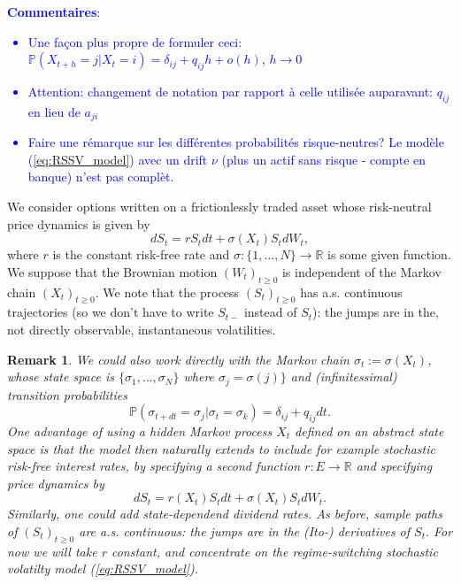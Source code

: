 \documentclass[a4paper, 11pt]{amsart}
\newtheorem{definition and theorem}[theorem]{Definition and   
Theorem}
\newtheorem{remark}[theorem]{%
Remark}
\begin{document}
\textcolor{blue}{{\bf Commentaires}:
    \begin{itemize}
        \item Une fa\c con plus  propre de formuler ceci: $\mathbb{P } (X_{t + h } = j | X_t = i ) = \delta _{ij } + q_{ij }  h + o(h) $, $h \to 0 $
        \item Attention: changement de notation par rapport \`a celle utilis\'ee auparavant: $q_{ij } $ en lieu de $a_{ji } $
        \item Faire une r\'emarque sur les diff\'erentes probabilit\'es risque-neutres? Le mod\`ele (\ref{eq:RSSV_model}) avec un drift $\nu $ (plus un actif sans risque - compte en banque) n'est pas compl\`et.
    \end{itemize}
}
\medskip

We consider options written on a frictionlessly traded asset  whose risk-neutral price dynamics is given by
\begin{equation} \label{eq:RSSV_model}
    dS_t = r S_t dt + \sigma (X_t ) S_t dW_t ,
\end{equation}
where $r $ is the constant risk-free rate and $\sigma : \{ 1 , \ldots , N \} \to \mathbb{R } $ is some given function. We suppose that the Brownian motion $(W_t )_{t \geq 0 } $ is independent of the Markov chain $(X_t )_{t \geq 0 } . $
We note that the process $(S_t )_{t \geq 0 } $ has a.s. continuous trajectories (so we don't have to write $S_{t- } $ instead of $S_t $): the jumps are in the, not directly observable, instantaneous volatilities.

\begin{remark} \rm{We could also work directly with the Markov chain $\sigma _t  := \sigma (X_t ) $, whose state space is $\{ \sigma _1 , \ldots , \sigma _N \} $ where $\sigma _j = \sigma (j) \} $ and (infinitessimal) transition probabilities
        $$
            \mathbb{P } (\sigma _{t + dt } = \sigma _j | \sigma _t = \sigma _k ) = \delta _{ij } + q_{ij } dt .
        $$
        One advantage of using a hidden Markov process $X_t $ defined on an abstract state space is that the model then naturally extends to include for example stochastic risk-free interest rates, by specifying a second function $r : E \to \mathbb{R } $ and specifying price dynamics by
        $$
            dS_t = r(X_t ) S_t dt + \sigma (X_t) S_t dW_t .
        $$
        Similarly, one could add state-dependend dividend rates. As before, sample paths of $(S_t )_{t \geq 0 } $ are a.s. continuous: the jumps are in the (Ito-) derivatives of $S_t . $  For now we will take $r $ constant, and concentrate on the regime-switching stochastic volatilty model (\ref{eq:RSSV_model}).
    }
\end{remark}
\end{document}
